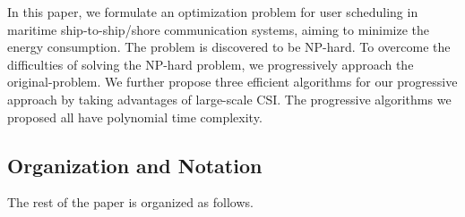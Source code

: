 \documentclass[conference]{IEEEtran}
\begin{document}







In this paper, we formulate an optimization problem for user scheduling in maritime ship-to-ship/shore communication systems, aiming to minimize the energy consumption. %
The problem is discovered to be NP-hard. %
To overcome the difficulties of solving the NP-hard problem, we progressively approach the original-problem. We further propose three efficient algorithms for our progressive approach by taking advantages of large-scale CSI. The progressive algorithms we proposed all have polynomial time complexity.



\subsection{Organization and Notation}
The rest of the paper is organized as follows.
\end{document}
